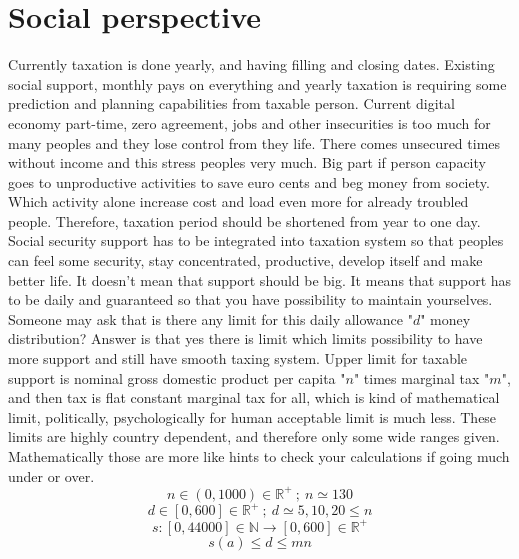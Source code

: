 \section{Social perspective}
\label{social_perspective}
Currently taxation is done yearly, and having filling and closing dates.
Existing social support, monthly pays on everything and yearly taxation is
requiring some prediction and planning capabilities from taxable person.
Current digital economy part-time, zero agreement, jobs and other insecurities
is too much for many peoples and they lose control from they life. There comes
unsecured times without income and this stress peoples very much. Big part if
person capacity goes to unproductive activities to save euro cents and beg
money from society. Which activity alone increase cost and load even more for
already troubled people. Therefore, taxation period should be shortened from
year to one day. Social security support has to be integrated into taxation
system so that peoples can feel some security, stay concentrated, productive,
develop itself and make better life. It doesn't mean that support should be
big. It means that support has to be daily and guaranteed so that you have
possibility to maintain yourselves. Someone may ask that is there any limit
for this daily allowance "$d$" money distribution? Answer is that yes there
is limit which limits possibility to have more support and still have smooth
taxing system. Upper limit for taxable support is nominal gross domestic
product per capita "$n$" times marginal tax "$m$", and then tax is flat
constant marginal tax for all, which is kind of mathematical limit,
politically, psychologically for human acceptable limit is much less. These
limits are highly country dependent, and therefore only some wide ranges
given. Mathematically those are more like hints to check your calculations if
going much under or over.
\begin{equation} \label{eq:const_n}
n \in (0,1000) \in \mathbb{R}^+
~;~ n \simeq 130
\end{equation}
\begin{equation} \label{eq:const_d}
d \in [0,600] \in \mathbb{R}^+
~;~ d \simeq 5, 10, 20 \leq n
\end{equation}
\begin{equation} \label{eq:const_s}
s: [0,44000]\in\mathbb{N} \rightarrow [0,600] \in \mathbb{R}^+
\end{equation}
\begin{equation} \label{eq:sup_s}
s(a)\leq d \leq mn
\end{equation}
